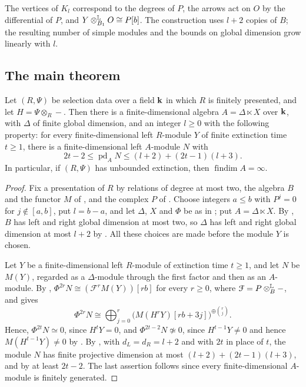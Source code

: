 The vertices of $K_l$ correspond to the degrees of $P$, the arrows act on $O$ by
the differential of $P$, and ${Y\Lotimes[B_1]O\cong P[b]}$. The construction uses
${l+2}$ copies of $B$; the resulting number of simple modules and the bounds on
global dimension grow linearly with $l$.

\subsection{The main theorem}
\label{subsec:main-theorem}

\begin{theorem}
  \label{thm:main}
  Let $(R,\Psi)$ be selection data over a field $\mathbf{k}$ in which $R$ is finitely
  presented, and let ${H=\Psi\otimes_R-}$. Then there is a finite-dimensional
  algebra ${A=\Delta\ltimes X}$ over $\mathbf{k}$, with $\Delta$ of finite global
  dimension, and an integer ${l\geq0}$ with the following property: for every
  finite-dimensional left $R$-module $Y$ of finite extinction time ${t\geq1}$,
  there is a finite-dimensional left $A$-module $N$ with
  \[
    2t-2\leq\operatorname{pd}_AN\leq(l+2)+(2t-1)(l+3).
  \]
  In particular, if $(R,\Psi)$ has unbounded extinction, then
  ${\operatorname{findim}A=\infty}$.
\end{theorem}

\begin{proof}
  Fix a presentation of $R$ by relations of degree at most two, the algebra $B$
  and the functor $M$ of , and the
  complex $P$ of . Choose integers ${a\leq b}$ with
  ${P^j=0}$ for ${j\notin[a,b]}$, put ${l=b-a}$, and let $\Delta$, $X$ and $\Phi$ be
  as in ; put ${A=\Delta\ltimes X}$. By
  , $B$ has left and right global dimension at
  most two, so $\Delta$ has left and right global dimension at most ${l+2}$ by
  . All these choices are made before the module $Y$ is
  chosen.

  Let $Y$ be a finite-dimensional left $R$-module of extinction time ${t\geq1}$,
  and let $N$ be $M(Y)$, regarded as a $\Delta$-module through the first factor
  and then as an $A$-module. By , ${\Phi^{2r}N\cong
  (\mathcal{F}^rM(Y))[rb]}$ for every ${r\geq0}$, where
  ${\mathcal{F}=P\Lotimes[B]-}$, and  gives
  \[
    \Phi^{2r}N\cong\bigoplus_{j=0}^r\bigl(M(H^rY)[rb+3j]\bigr)^{\oplus
    \binom{r}{j}}.
  \]
  Hence, ${\Phi^{2t}N\simeq0}$, since ${H^tY=0}$, and ${\Phi^{2t-2}N\not\simeq0}$,
  since ${H^{t-1}Y\neq0}$ and hence ${M(H^{t-1}Y)\neq0}$ by
  . By , with
  ${d_L=d_R=l+2}$ and with $2t$ in place of $t$, the module $N$ has finite
  projective dimension at most ${(l+2)+(2t-1)(l+3)}$, and by
   at least ${2t-2}$. The last assertion follows since
  every finite-dimensional $A$-module is finitely generated.
\end{proof}

